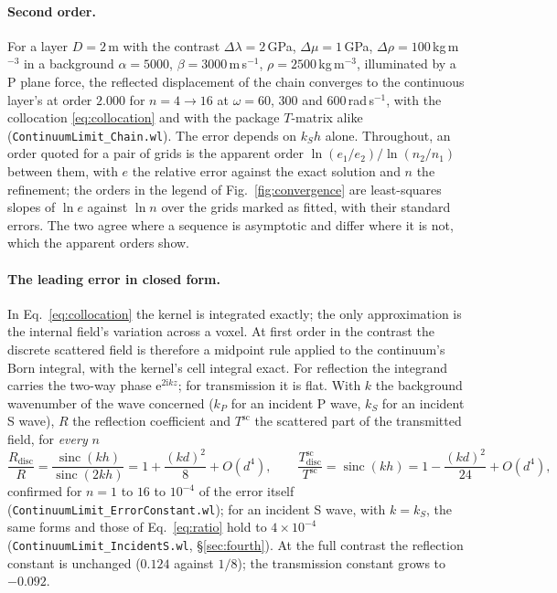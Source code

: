 \documentclass[11pt,a4paper]{article}
\newcommand{\sinc}{\operatorname{sinc}}
\newcommand{\nb}[1]{\texttt{#1}}
\begin{document}
\paragraph{Second order.} For a layer $D=2$\,m with the contrast
$\Delta\lambda=2$\,GPa, $\Delta\mu=1$\,GPa, $\Delta\rho=100$\,kg\,m$^{-3}$ in a background
$\alpha=5000$, $\beta=3000$\,m\,s$^{-1}$, $\rho=2500$\,kg\,m$^{-3}$, illuminated by a P plane force,
the reflected displacement of the chain converges to the continuous layer's at order $2.000$ for
$n=4\to16$ at $\omega=60$, $300$ and $600$\,rad\,s$^{-1}$, with the collocation
\eqref{eq:collocation} and with the package $T$-matrix alike (\nb{ContinuumLimit\_Chain.wl}). The
error depends on $k_Sh$ alone. Throughout, an order quoted for a pair of grids is the apparent order
$\ln(e_1/e_2)/\ln(n_2/n_1)$ between them, with $e$ the relative error against the exact solution
and $n$ the refinement; the orders in the legend of Fig.~\ref{fig:convergence} are least-squares
slopes of $\ln e$ against $\ln n$ over the grids marked as fitted, with their standard errors. The
two agree where a sequence is asymptotic and differ where it is not, which the apparent orders show.

\paragraph{The leading error in closed form.} In Eq.~\eqref{eq:collocation} the kernel is
integrated exactly; the only approximation is the internal field's variation across a voxel. At
first order in the contrast the discrete scattered field is therefore a midpoint rule applied to
the continuum's Born integral, with the kernel's cell integral exact. For reflection the integrand
carries the two-way phase $\mathrm{e}^{2\mathrm{i}kz}$; for transmission it is flat. With $k$ the background
wavenumber of the wave concerned ($k_P$ for an incident P wave, $k_S$ for an incident S wave), $R$ the reflection coefficient and $T^{\text{sc}}$ the
scattered part of the transmitted field, for \emph{every} $n$
\begin{equation}\label{eq:errorR}
  \frac{R_{\text{disc}}}{R}=\frac{\sinc(kh)}{\sinc(2kh)}=1+\frac{(kd)^2}{8}+O(d^4),
  \qquad
  \frac{T^{\text{sc}}_{\text{disc}}}{T^{\text{sc}}}=\sinc(kh)=1-\frac{(kd)^2}{24}+O(d^4),
\end{equation}
confirmed for $n=1$ to $16$ to $10^{-4}$ of the error itself
(\nb{ContinuumLimit\_ErrorConstant.wl}); for an incident S wave, with $k=k_S$, the same forms and those of
Eq.~\eqref{eq:ratio} hold to $4\times10^{-4}$ (\nb{ContinuumLimit\_IncidentS.wl}, \S\ref{sec:fourth}). At the full contrast the reflection constant is unchanged
($0.124$ against $1/8$); the transmission constant grows to $-0.092$.
\end{document}
